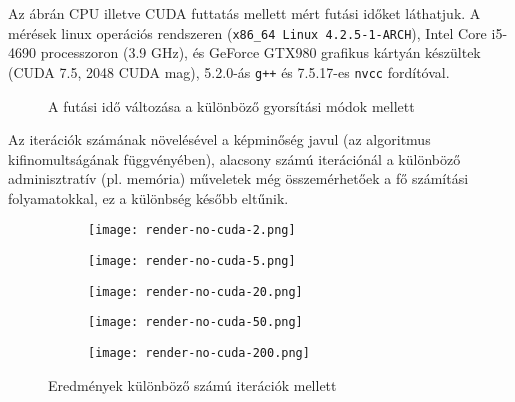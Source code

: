 \documentclass[a4paper,12pt]{article}
\begin{document}
Az ábrán CPU illetve CUDA futtatás mellett mért futási időket láthatjuk.
A mérések linux operációs rendszeren (\texttt{x86\_64 Linux 4.2.5-1-ARCH}),
Intel Core i5-4690 processzoron (3.9 GHz), és GeForce GTX980 grafikus kártyán
készültek (CUDA 7.5, 2048 CUDA mag), 5.2.0-ás \texttt{g++} és 7.5.17-es \texttt{nvcc} fordítóval.

\begin{figure}[h!]
\centering
{}
  \caption{A futási idő változása a különböző gyorsítási módok mellett}
\end{figure}

Az iterációk számának növelésével a képminőség javul (az algoritmus kifinomultságának függvényében),
alacsony számú iterációnál a különböző adminisztratív (pl. memória) műveletek még összemérhetőek a fő számítási folyamatokkal, ez a különbség később eltűnik.

\begin{figure}[h!]
  \centering
  \begin{subfigure}[b]{0.19\textwidth}
    \texttt{[image: render-no-cuda-2.png]}
  \end{subfigure}
  \begin{subfigure}[b]{0.19\textwidth}
    \texttt{[image: render-no-cuda-5.png]}
  \end{subfigure}
  \begin{subfigure}[b]{0.19\textwidth}
    \texttt{[image: render-no-cuda-20.png]}
  \end{subfigure}
  \begin{subfigure}[b]{0.19\textwidth}
    \texttt{[image: render-no-cuda-50.png]}
  \end{subfigure}
  \begin{subfigure}[b]{0.19\textwidth}
    \texttt{[image: render-no-cuda-200.png]}
  \end{subfigure}
  \caption{Eredmények különböző számú iterációk mellett}
\end{figure}
\end{document}

